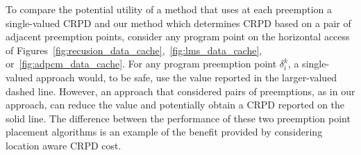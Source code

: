 To compare the potential utility of a method that uses at each preemption a single-valued CRPD and our method which determines CRPD based on a pair of adjacent preemption points, consider any program point on the horizontal access of Figures~\ref{fig:recusion_data_cache},~\ref{fig:lms_data_cache}, or~\ref{fig:adpcm_data_cache}.  For any program preemption point $\delta_i^k$, a single-valued approach would, to be safe, use the value reported in the larger-valued dashed line.  However, an approach that considered pairs of preemptions, as in our approach, can reduce the value and potentially obtain a CRPD reported on the solid line.
The difference between the performance of these two preemption point placement algorithms is an example of the benefit provided by considering location aware CRPD cost.

